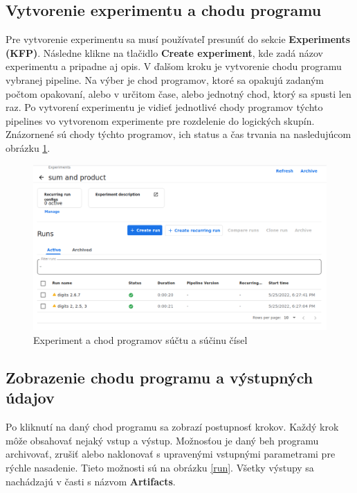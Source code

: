 \subsection*{Vytvorenie experimentu a chodu programu}

Pre vytvorenie experimentu sa musí používateľ presunúť do sekcie \textbf{Experiments (KFP)}. Následne klikne na tlačidlo \textbf{Create experiment}, kde zadá názov experimentu a pripadne aj opis. V ďalšom kroku je vytvorenie chodu programu vybranej pipeline. Na výber je chod programov, ktoré sa opakujú zadaným počtom opakovaní, alebo v určitom čase, alebo jednotný chod, ktorý sa spusti len raz. Po vytvorení experimentu je vidieť jednotlivé chody programov týchto pipelines vo vytvorenom experimente pre rozdelenie do logických skupín. Znázornené sú chody týchto programov, ich status a čas trvania na nasledujúcom obrázku \ref{exp}.

\begin{figure}[!h]
    \centering
    \includegraphics[width=1\linewidth]{figures/10.png}
    \caption{Experiment a chod programov súčtu a súčinu čísel}
    \label{exp}
\end{figure}

\subsection*{Zobrazenie chodu programu a výstupných údajov}

Po kliknutí na daný chod programu sa zobrazí postupnosť krokov. Každý krok môže obsahovať nejaký vstup a výstup. Možnosťou je daný beh programu archivovať, zrušiť alebo naklonovať s upravenými vstupnými parametrami pre rýchle nasadenie. Tieto možnosti sú na obrázku \ref{run}. Všetky výstupy sa nachádzajú v časti s názvom \textbf{Artifacts}.


